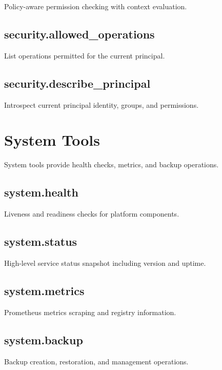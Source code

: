 \documentclass[a4paper,twoside]{sapthesis}
\begin{document}
Policy-aware permission checking with context evaluation.

\subsection{security.allowed\_operations}

List operations permitted for the current principal.

\subsection{security.describe\_principal}

Introspect current principal identity, groups, and permissions.

\section{System Tools}
\label{app:tools:system}

System tools provide health checks, metrics, and backup operations.

\subsection{system.health}

Liveness and readiness checks for platform components.

\subsection{system.status}

High-level service status snapshot including version and uptime.

\subsection{system.metrics}

Prometheus metrics scraping and registry information.

\subsection{system.backup}

Backup creation, restoration, and management operations.

\end{document}
